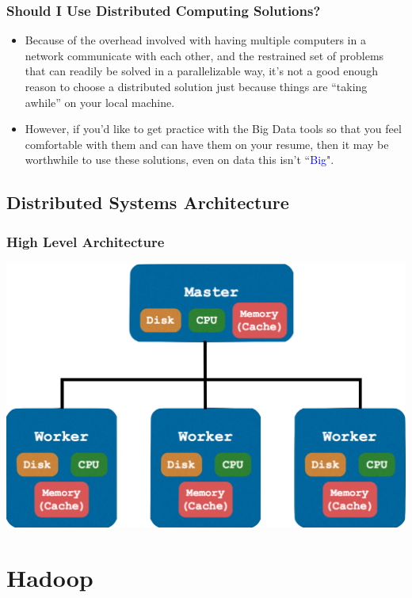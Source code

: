 \documentclass{beamer}
\begin{document}
\begin{frame}
  \frametitle{Should I Use Distributed Computing Solutions?}
  \begin{itemize}
    \item Because of the overhead involved with having multiple computers in a network communicate with each other, and the restrained set of problems that can readily be solved in a parallelizable way, it's not a good enough reason to choose a distributed solution just because things are ``taking awhile'' on your local machine.
    \item However, if you'd like to get practice with the Big Data tools so that you feel comfortable with them and can have them on your resume, then it may be worthwhile to use these solutions, even on data this isn't ``\textcolor{blue}{Big}".
  \end{itemize}
\end{frame}

\subsection{Distributed Systems Architecture}
\begin{frame}
  \frametitle{High Level Architecture}
  \centering
  \includegraphics[width=\textwidth]{../images/simple_architecture.png}
\end{frame}

\section{Hadoop}
\end{document}
